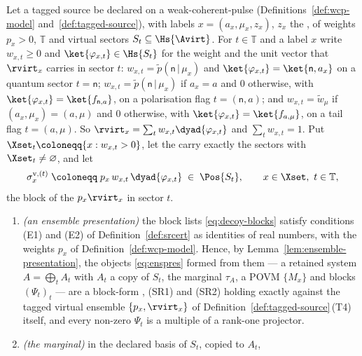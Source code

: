 \begin{proposition}
\label{prop:decoy-cert}
Let a tagged source be declared on a weak-coherent-pulse 
(Definitions~\ref{def:wcp-model} and~\ref{def:tagged-source}), with labels
$x=(a_x,\mu_x,z_x)$, $z_x$ the , of weights $p_x>0$,
 $\mathbb{T}$ and
virtual sectors $S_t\subseteq\Hs{\Avirt}$. For $t\in\mathbb{T}$ and a label $x$
write $w_{x,t}\ge0$ and $\ket{\varphi_{x,t}}\in\Hs{S_t}$ for the weight and the
unit vector that $\rvirt_x$ carries in sector $t$:
$w_{x,t}=\tilde p(\mathsf{n}\,|\,\mu_x)$ and
$\ket{\varphi_{x,t}}=\ket{\mathsf{n},a_x}$ on a quantum sector $t=\mathsf{n}$;
$w_{x,t}=\tilde p(\mathsf{n}\,|\,\mu_x)$ if $a_x=a$ and $0$ otherwise, with
$\ket{\varphi_{x,t}}=\ket{f_{\mathsf{n},a}}$, on a polarisation flag
$t=(\mathsf{n},a)$; and $w_{x,t}=\tilde w_{\mu}$ if $(a_x,\mu_x)=(a,\mu)$ and
$0$ otherwise, with $\ket{\varphi_{x,t}}=\ket{f_{a,\mu}}$, on a tail flag
$t=(a,\mu)$. So $\rvirt_x=\sum_tw_{x,t}\dyad{\varphi_{x,t}}$ and
$\sum_tw_{x,t}=1$. Put $\Xset_t\coloneqq\{x:w_{x,t}>0\}$, let the
 carry exactly the sectors with $\Xset_t\ne\varnothing$, and let
\begin{equation}\label{eq:decoy-blocks}
  \sigma^{\mathrm v,(t)}_x\;\coloneqq\;p_x\,w_{x,t}\,\dyad{\varphi_{x,t}}
  \;\in\;\Pos{S_t},\qquad x\in\Xset,\ t\in\mathbb{T} ,
\end{equation}
the block of the  $p_x\rvirt_x$ in
sector $t$.
\begin{enumerate}[label=(\roman*),leftmargin=2.2em]
\item \emph{(an ensemble presentation)} the block lists
\eqref{eq:decoy-blocks} satisfy conditions (E1) and (E2) of
Definition~\ref{def:srcert} as identities of real numbers, with the weights
$p_x$ of Definition~\ref{def:wcp-model}. Hence, by
Lemma~\ref{lem:ensemble-presentation}, the objects \eqref{eq:enspres} formed
from them --- a retained system $A=\bigoplus_tA_t$ with $A_t$ a copy of $S_t$,
the marginal $\tau_A$, a POVM $\{M_x\}$ and blocks $(\Psi_t)_t$ --- are a
block-form , (SR1) and (SR2) holding exactly
against the tagged virtual ensemble $\{p_x,\rvirt_x\}$ of
Definition~\ref{def:tagged-source}\,(T4) itself, and every non-zero $\Psi_t$ is
a multiple of a rank-one projector.
\item \emph{(the marginal)} in the declared basis of $S_t$, copied to $A_t$,
\begin{equation}\label{eq:decoy-marginal}

\end{equation}
\end{enumerate}
\end{proposition}
